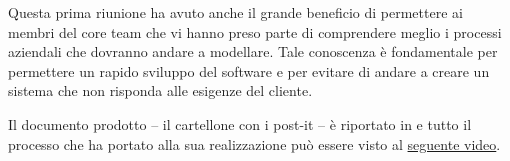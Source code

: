 Questa prima riunione ha avuto anche il grande beneficio di permettere ai membri del core team che vi hanno preso parte di comprendere meglio i processi aziendali che dovranno andare a modellare. Tale conoscenza è fondamentale per permettere un rapido sviluppo del software e per evitare di andare a creare un sistema che non risponda alle esigenze del cliente.

Il documento prodotto -- il cartellone con i post-it -- è riportato in  e tutto il processo che ha portato alla sua realizzazione può essere visto al \href{https://youtu.be/BvkPYtI8MF8}{seguente video}.
